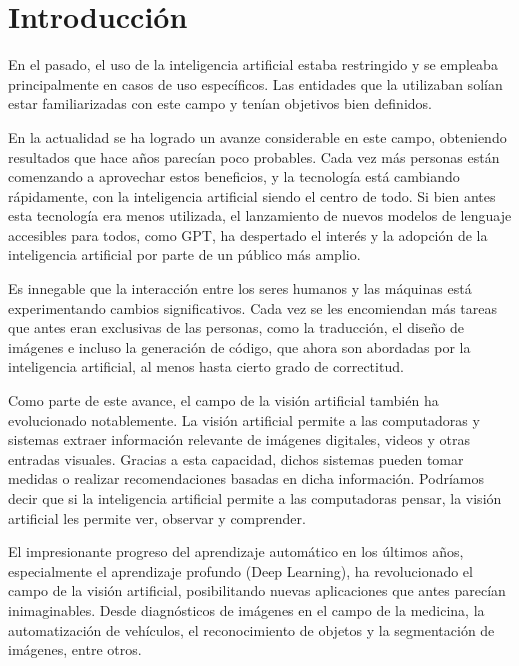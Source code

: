 \chapter*{Introducci\'on}\label{chapter:introduction}

En el pasado, el uso de la inteligencia artificial estaba restringido y se empleaba principalmente en casos de uso espec\'ificos. Las entidades que la utilizaban sol\'ian estar familiarizadas con este campo y ten\'ian objetivos bien definidos.

En la actualidad se ha logrado un avanze considerable en este campo, obteniendo resultados que hace a\~nos parec\'ian poco probables. Cada vez m\'as personas est\'an comenzando a aprovechar estos beneficios, y la tecnolog\'ia est\'a cambiando r\'apidamente, con la inteligencia artificial siendo el centro de todo. Si bien antes esta tecnolog\'ia era menos utilizada,  el lanzamiento de nuevos modelos de lenguaje accesibles para todos, como GPT, ha despertado el inter\'es y la adopci\'on de la inteligencia artificial por parte de un p\'ublico m\'as amplio.

Es innegable que la interacci\'on entre los seres humanos y las m\'aquinas est\'a experimentando cambios significativos. Cada vez se les encomiendan m\'as tareas que antes eran exclusivas de las personas, como la traducci\'on, el dise\~no de im\'agenes e incluso la generaci\'on de c\'odigo, que ahora son abordadas por la inteligencia artificial, al menos hasta cierto grado de correctitud.

Como parte de este avance, el campo de la visi\'on artificial tambi\'en ha evolucionado notablemente. La visi\'on artificial permite a las computadoras y sistemas extraer informaci\'on relevante de im\'agenes digitales, videos y otras entradas visuales. Gracias a esta capacidad, dichos sistemas pueden tomar medidas o realizar recomendaciones basadas en dicha informaci\'on. Podr\'iamos decir que si la inteligencia artificial permite a las computadoras pensar, la visi\'on artificial les permite ver, observar y comprender.

El impresionante progreso del aprendizaje autom\'atico en los \'ultimos a\~nos, especialmente el aprendizaje profundo (Deep Learning), ha revolucionado el campo de la visi\'on artificial, posibilitando nuevas aplicaciones que antes parec\'ian inimaginables. Desde diagn\'osticos de im\'agenes en el campo de la medicina, la automatizaci\'on de veh\'iculos, el reconocimiento de objetos y la segmentaci\'on de im\'agenes, entre otros.

